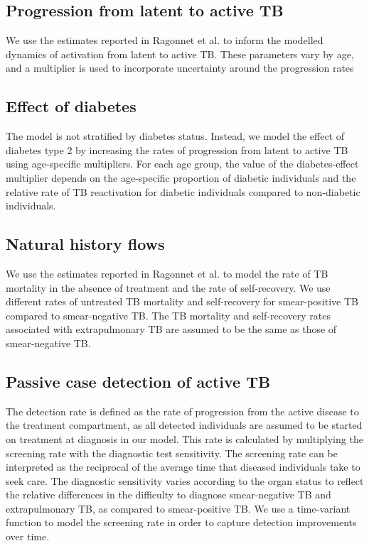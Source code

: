 \subsection{Progression from latent to active TB}
We use the estimates reported in Ragonnet et al. to inform the modelled dynamics of activation from 
latent to active TB. These parameters vary by age, and a multiplier is used to 
incorporate uncertainty around the progression rates
\subsection{Effect of diabetes}
The model is not stratified by diabetes status. Instead, we model the effect of diabetes type 2 by 
increasing the rates of progression from latent to active TB using age-specific multipliers. For each 
age group, the value of the diabetes-effect multiplier depends on the age-specific proportion of 
diabetic individuals and the relative rate of TB reactivation for diabetic individuals compared to non-diabetic individuals.
\subsection{Natural history flows}
We use the estimates reported in Ragonnet et al. to model the rate of TB mortality in the absence of 
treatment and the rate of self-recovery. We use different rates of untreated TB mortality and self-recovery for smear-positive TB compared to smear-negative TB. The TB mortality and self-recovery 
rates associated with extrapulmonary TB are assumed to be the same as those of smear-negative TB.
\subsection{Passive case detection of active TB}
The detection rate is defined as the rate of progression from the active disease to the treatment 
compartment, as all detected individuals are assumed to be started on treatment at diagnosis in our 
model. This rate is calculated by multiplying the screening rate with the diagnostic test sensitivity. 
The screening rate can be interpreted as the reciprocal of the average time that diseased individuals 
take to seek care. The diagnostic sensitivity varies according to the organ status to reflect the relative 
differences in the difficulty to diagnose smear-negative TB and extrapulmonary TB, as compared to 
smear-positive TB.
We use a time-variant function to model the screening rate in order to capture detection improvements 
over time.
